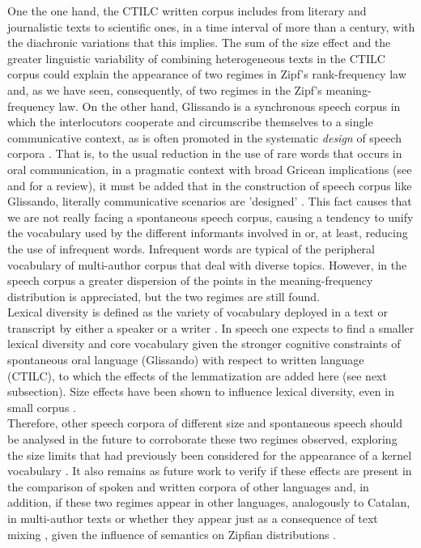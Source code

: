 \documentclass[10pt,letterpaper]{article}
\begin{document}
One the one hand, the CTILC written corpus includes from literary and journalistic texts to scientific ones, in a time interval of more than a century, with the diachronic variations that this implies. The sum of the size effect and the greater linguistic varia\-bi\-li\-ty of combining heterogeneous texts in the CTILC corpus could explain the appearance of two regimes in Zipf's rank-frequency law \cite{MONTEMURRO2001, Williams2015, montemurro2002new} and, as we have seen, consequently, of two regimes in the Zipf's meaning-frequency law. On the other hand, Glissando is a synchronous speech corpus in which the interlocutors cooperate and circumscribe themselves to a single communicative context, as is often promoted in the systematic \textit{design} of speech corpora \cite{garrido2013}. That is, to the usual reduction in the use of rare words that occurs in oral communication, in a pragmatic context with broad Gricean implications (see\cite{grice1975logic} and \cite{DAVIES2007} for a review), 
it must be added that in the construction of speech corpus like Glissando, literally communicative scenarios are 'designed' \cite{garrido2013}. This fact causes that we are not really facing a spontaneous speech corpus, causing a tendency to unify the vocabulary used by the different informants involved in or, at least, reducing the use of infrequent words. Infrequent words are typical of the peripheral vocabulary of multi-author corpus that deal with diverse topics. However, in the speech corpus a greater dispersion of the points in the meaning-frequency distribution is appreciated, but the two regimes are still found.\\

Lexical diversity is defined as the variety of vocabulary deployed in a text or transcript by either a speaker or a writer \cite{mccarthy2010}. In speech one expects to find a smaller lexical diversity and core vocabulary given the stronger cognitive constraints of spontaneous oral language (Glissando) with respect to written language (CTILC), to which the effects of the lemmatization are added here (see next subsection). Size effects have been shown to influence lexical diversity, even in small corpus \cite{koizumi2012effects}.\\

Therefore, other speech corpora of different size and spontaneous speech should be analysed in the future
to corroborate these two regimes observed,
exploring the size limits that had previously been considered for the appearance of a kernel vocabulary \cite{ferrer2001two}.  It also remains as future work to verify if these  effects are present in the comparison of spoken and written corpora of other languages and, in addition, if these two regimes appear in other languages, analogously to Catalan, in multi-author texts or whether they appear just as a consequence of text mixing \cite{Williams2015, petersen2012languages}, given the influence of semantics on Zipfian distributions \cite{piantadosi2014zipf,Carrera2021a}.\\
\end{document}
